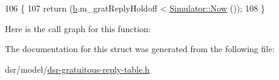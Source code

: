 \begin{DoxyCode}
106     \{
107       \textcolor{keywordflow}{return} (\hyperlink{buildings__pathloss_8m_a21ad0bd836b90d08f4cf640b4c298e7c}{b}.m\_gratReplyHoldoff < \hyperlink{classns3_1_1Simulator_ac3178fa975b419f7875e7105be122800}{Simulator::Now} ());
108     \}
\end{DoxyCode}


Here is the call graph for this function\+:




The documentation for this struct was generated from the following file\+:\begin{DoxyCompactItemize}
\item 
dsr/model/\hyperlink{dsr-gratuitous-reply-table_8h}{dsr-\/gratuitous-\/reply-\/table.\+h}\end{DoxyCompactItemize}
